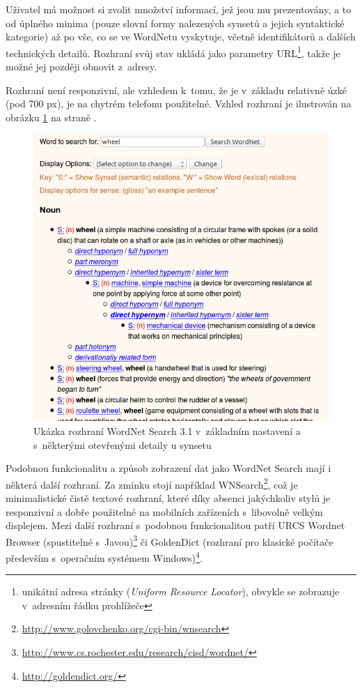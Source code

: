 \documentclass[a4paper, 11pt, oneside, showtrims]{book}
\begin{document}
					Uživatel má možnost si zvolit množství informací, jež jsou mu prezentovány, a to od úplného minima (pouze slovní formy nalezených synsetů a jejich syntaktické kategorie) až po vše, co se ve WordNetu vyskytuje, včetně identifikátorů a dalších technických detailů. Rozhraní svůj stav ukládá jako parametry URL\footnote{unikátní adresa stránky (\textit{Uniform Resource Locator}), obvykle se zobrazuje v~adresním řádku prohlížeče}, takže je možné jej později obnovit z~adresy.

					Rozhraní není responzivní, ale vzhledem k~tomu, že je v~základu relativně úzké (pod 700 px), je na chytrém telefonu použitelné. Vzhled rozhraní je ilustrován na obrázku \ref{fig:wnsearch} na straně \pageref{fig:wnsearch}.

					\begin{figure}[h]
						\centering
						\includegraphics[width=1.0\textwidth]{wnsearch.png}
						\caption{Ukázka rozhraní WordNet Search 3.1 v~základním nastavení a s~některými otevřenými detaily u synsetu}
						\label{fig:wnsearch}
					\end{figure}

					Podobnou funkcionalitu a způsob zobrazení dat jako WordNet Search mají i některá další rozhraní. Za zmínku stojí například WNSearch\footnote{\url{http://www.golovchenko.org/cgi-bin/wnsearch}}, což je minimalistické čistě textové rozhraní, které díky absenci jakýchkoliv stylů je responzivní a dobře použitelné na mobilních zařízeních s~libovolně velkým displejem. Mezi další rozhraní s~podobnou funkcionalitou patří URCS Wordnet Browser (spustitelné s~Javou)\footnote{\url{http://www.cs.rochester.edu/research/cisd/wordnet/}} či GoldenDict (rozhraní pro klasické počítače především s~operačním systémem Windows)\footnote{\url{http://goldendict.org/}}.
\end{document}

